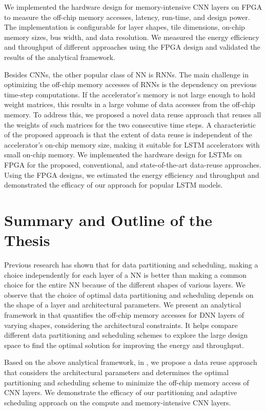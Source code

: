 We implemented the hardware design for memory-intensive CNN layers on FPGA to measure the off-chip memory accesses, latency, run-time, and design power. The implementation is configurable for layer shapes, tile dimensions, on-chip memory sizes, bus width, and data resolution. We measured the energy efficiency and throughput of different approaches using the FPGA design and validated the results of the analytical framework.

Besides CNNs, the other popular class of NN is RNNs. The main challenge in optimizing the off-chip memory accesses of RNNs is the dependency on previous time-step computations. If the accelerator's memory is not large enough to hold weight matrices, this results in a large volume of data accesses from the off-chip memory. To address this, we proposed a novel data reuse approach that reuses all the weights of such matrices for the two consecutive time steps. A characteristic of the proposed approach is that the extent of data reuse is independent of the accelerator's on-chip memory size, making it suitable for LSTM accelerators with small on-chip memory. We implemented the hardware design for LSTMs on FPGA for the proposed, conventional, and state-of-the-art data-reuse approaches. Using the FPGA designs, we estimated the energy efficiency and throughput and demonstrated the efficacy of our approach for popular LSTM models.
\section{Summary and Outline of the Thesis} 
Previous research has shown that for data partitioning and scheduling, making a choice independently for each layer of a NN is better than making a common choice for the entire NN because of the different shapes of various layers. We observe that the choice of optimal data partitioning and scheduling depends on the shape of a layer and architectural parameters. We present an analytical framework in  that quantifies the off-chip memory accesses for DNN layers of varying shapes, considering the architectural constraints. It helps compare different data partitioning and scheduling schemes to explore the large design space to find the optimal solution for improving the energy and throughput. 

Based on the above analytical framework, in , we propose a data reuse approach that considers the architectural parameters and determines the optimal partitioning and scheduling scheme to minimize the off-chip memory access of CNN layers. We demonstrate the efficacy of our partitioning and adaptive scheduling approach on the compute and memory-intensive CNN layers. 

